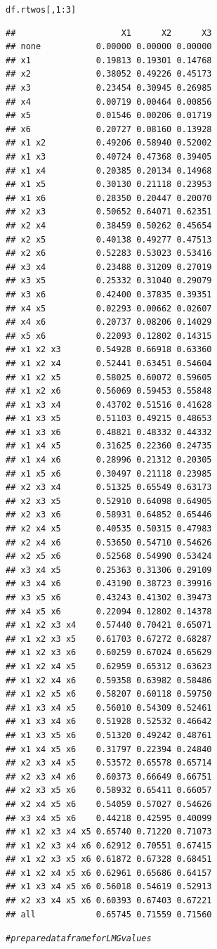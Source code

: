 \documentclass[11pt,a4paper,twoside]{book}\usepackage[]{graphicx}\usepackage[]{color}
\makeatletter
\newcommand{\hlnum}[1]{\textcolor[rgb]{0.686,0.059,0.569}{#1}}%
\newcommand{\hlcom}[1]{\textcolor[rgb]{0.678,0.584,0.686}{\textit{#1}}}%
\newcommand{\hlopt}[1]{\textcolor[rgb]{0,0,0}{#1}}%
\newcommand{\hlstd}[1]{\textcolor[rgb]{0.345,0.345,0.345}{#1}}%
\newenvironment{kframe}{%
 \def\at@end@of@kframe{}%
 \ifinner\ifhmode%
  \def\at@end@of@kframe{\end{minipage}}%
  \begin{minipage}{\columnwidth}%
 \fi\fi%
 \def\FrameCommand##1{\hskip\@totalleftmargin \hskip-\fboxsep
 \colorbox{shadecolor}{##1}\hskip-\fboxsep
     \hskip-\linewidth \hskip-\@totalleftmargin \hskip\columnwidth}%
 \MakeFramed {\advance\hsize-\width
   \@totalleftmargin\z@ \linewidth\hsize
   \@setminipage}}%
 {\par\unskip\endMakeFramed%
 \at@end@of@kframe}
\newenvironment{knitrout}{}{} %
\makeatother
\begin{document}
\begin{knitrout}
\begin{kframe}
\begin{alltt}
\hlstd{df.rtwos[,}\hlnum{1}\hlopt{:}\hlnum{3}\hlstd{]}
\end{alltt}
\begin{verbatim}
##                     X1      X2      X3
## none           0.00000 0.00000 0.00000
## x1             0.19813 0.19301 0.14768
## x2             0.38052 0.49226 0.45173
## x3             0.23454 0.30945 0.26985
## x4             0.00719 0.00464 0.00856
## x5             0.01546 0.00206 0.01719
## x6             0.20727 0.08160 0.13928
## x1 x2          0.49206 0.58940 0.52002
## x1 x3          0.40724 0.47368 0.39405
## x1 x4          0.20385 0.20134 0.14968
## x1 x5          0.30130 0.21118 0.23953
## x1 x6          0.28350 0.20447 0.20070
## x2 x3          0.50652 0.64071 0.62351
## x2 x4          0.38459 0.50262 0.45654
## x2 x5          0.40138 0.49277 0.47513
## x2 x6          0.52283 0.53023 0.53416
## x3 x4          0.23488 0.31209 0.27019
## x3 x5          0.25332 0.31040 0.29079
## x3 x6          0.42400 0.37835 0.39351
## x4 x5          0.02293 0.00662 0.02607
## x4 x6          0.20737 0.08206 0.14029
## x5 x6          0.22093 0.12802 0.14315
## x1 x2 x3       0.54928 0.66918 0.63360
## x1 x2 x4       0.52441 0.63451 0.54604
## x1 x2 x5       0.58025 0.60072 0.59605
## x1 x2 x6       0.56069 0.59453 0.55848
## x1 x3 x4       0.43702 0.51516 0.41628
## x1 x3 x5       0.51103 0.49215 0.48653
## x1 x3 x6       0.48821 0.48332 0.44332
## x1 x4 x5       0.31625 0.22360 0.24735
## x1 x4 x6       0.28996 0.21312 0.20305
## x1 x5 x6       0.30497 0.21118 0.23985
## x2 x3 x4       0.51325 0.65549 0.63173
## x2 x3 x5       0.52910 0.64098 0.64905
## x2 x3 x6       0.58931 0.64852 0.65446
## x2 x4 x5       0.40535 0.50315 0.47983
## x2 x4 x6       0.53650 0.54710 0.54626
## x2 x5 x6       0.52568 0.54990 0.53424
## x3 x4 x5       0.25363 0.31306 0.29109
## x3 x4 x6       0.43190 0.38723 0.39916
## x3 x5 x6       0.43243 0.41302 0.39473
## x4 x5 x6       0.22094 0.12802 0.14378
## x1 x2 x3 x4    0.57440 0.70421 0.65071
## x1 x2 x3 x5    0.61703 0.67272 0.68287
## x1 x2 x3 x6    0.60259 0.67024 0.65629
## x1 x2 x4 x5    0.62959 0.65312 0.63623
## x1 x2 x4 x6    0.59358 0.63982 0.58486
## x1 x2 x5 x6    0.58207 0.60118 0.59750
## x1 x3 x4 x5    0.56010 0.54309 0.52461
## x1 x3 x4 x6    0.51928 0.52532 0.46642
## x1 x3 x5 x6    0.51320 0.49242 0.48761
## x1 x4 x5 x6    0.31797 0.22394 0.24840
## x2 x3 x4 x5    0.53572 0.65578 0.65714
## x2 x3 x4 x6    0.60373 0.66649 0.66751
## x2 x3 x5 x6    0.58932 0.65411 0.66057
## x2 x4 x5 x6    0.54059 0.57027 0.54626
## x3 x4 x5 x6    0.44218 0.42595 0.40099
## x1 x2 x3 x4 x5 0.65740 0.71220 0.71073
## x1 x2 x3 x4 x6 0.62912 0.70551 0.67415
## x1 x2 x3 x5 x6 0.61872 0.67328 0.68451
## x1 x2 x4 x5 x6 0.62961 0.65686 0.64157
## x1 x3 x4 x5 x6 0.56018 0.54619 0.52913
## x2 x3 x4 x5 x6 0.60393 0.67403 0.67221
## all            0.65745 0.71559 0.71560
\end{verbatim}
\begin{alltt}
\hlcom{# prepare data frame for LMG values}


\end{alltt}
\end{kframe}
\end{knitrout}
\end{document}
